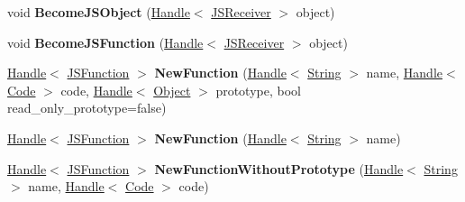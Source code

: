 \begin{DoxyCompactItemize}
\item 
\hypertarget{classv8_1_1internal_1_1_v8___f_i_n_a_l_ac68eccf43076bc6ea11449e1292f563e}{}void {\bfseries Become\+J\+S\+Object} (\hyperlink{classv8_1_1internal_1_1_handle}{Handle}$<$ \hyperlink{classv8_1_1internal_1_1_j_s_receiver}{J\+S\+Receiver} $>$ object)\label{classv8_1_1internal_1_1_v8___f_i_n_a_l_ac68eccf43076bc6ea11449e1292f563e}

\item 
\hypertarget{classv8_1_1internal_1_1_v8___f_i_n_a_l_ae1fac10ad98d8ecac75bfb6d35897eb8}{}void {\bfseries Become\+J\+S\+Function} (\hyperlink{classv8_1_1internal_1_1_handle}{Handle}$<$ \hyperlink{classv8_1_1internal_1_1_j_s_receiver}{J\+S\+Receiver} $>$ object)\label{classv8_1_1internal_1_1_v8___f_i_n_a_l_ae1fac10ad98d8ecac75bfb6d35897eb8}

\item 
\hypertarget{classv8_1_1internal_1_1_v8___f_i_n_a_l_a3e3abf79a68605dd9247ce8a8d3988ea}{}\hyperlink{classv8_1_1internal_1_1_handle}{Handle}$<$ \hyperlink{classv8_1_1internal_1_1_j_s_function}{J\+S\+Function} $>$ {\bfseries New\+Function} (\hyperlink{classv8_1_1internal_1_1_handle}{Handle}$<$ \hyperlink{classv8_1_1internal_1_1_string}{String} $>$ name, \hyperlink{classv8_1_1internal_1_1_handle}{Handle}$<$ \hyperlink{classv8_1_1internal_1_1_code}{Code} $>$ code, \hyperlink{classv8_1_1internal_1_1_handle}{Handle}$<$ \hyperlink{classv8_1_1internal_1_1_object}{Object} $>$ prototype, bool read\+\_\+only\+\_\+prototype=false)\label{classv8_1_1internal_1_1_v8___f_i_n_a_l_a3e3abf79a68605dd9247ce8a8d3988ea}

\item 
\hypertarget{classv8_1_1internal_1_1_v8___f_i_n_a_l_a9df15260cad97fc9fb6ba768818b2439}{}\hyperlink{classv8_1_1internal_1_1_handle}{Handle}$<$ \hyperlink{classv8_1_1internal_1_1_j_s_function}{J\+S\+Function} $>$ {\bfseries New\+Function} (\hyperlink{classv8_1_1internal_1_1_handle}{Handle}$<$ \hyperlink{classv8_1_1internal_1_1_string}{String} $>$ name)\label{classv8_1_1internal_1_1_v8___f_i_n_a_l_a9df15260cad97fc9fb6ba768818b2439}

\item 
\hypertarget{classv8_1_1internal_1_1_v8___f_i_n_a_l_aa028fb6daab6643d25b576a6b79cfee5}{}\hyperlink{classv8_1_1internal_1_1_handle}{Handle}$<$ \hyperlink{classv8_1_1internal_1_1_j_s_function}{J\+S\+Function} $>$ {\bfseries New\+Function\+Without\+Prototype} (\hyperlink{classv8_1_1internal_1_1_handle}{Handle}$<$ \hyperlink{classv8_1_1internal_1_1_string}{String} $>$ name, \hyperlink{classv8_1_1internal_1_1_handle}{Handle}$<$ \hyperlink{classv8_1_1internal_1_1_code}{Code} $>$ code)\label{classv8_1_1internal_1_1_v8___f_i_n_a_l_aa028fb6daab6643d25b576a6b79cfee5}


\end{DoxyCompactItemize}
